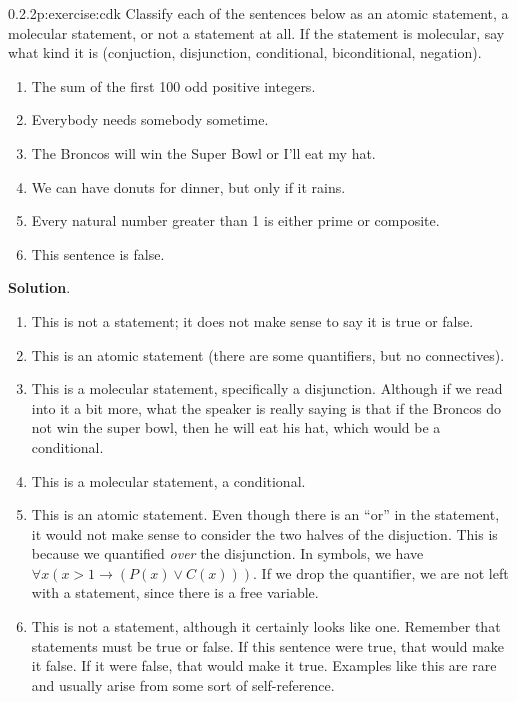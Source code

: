 \documentclass[twoside,11pt,]{book}
\newcommand{\blocktitlefont}{\relax}
\numberwithin{equation}{chapter}
\newcommand{\imp}{\rightarrow}
\begin{document}
\begin{divisionsolution}{0.2.2}{}{p:exercise:cdk}%
Classify each of the sentences below as an atomic statement, a molecular statement, or not a statement at all. If the statement is molecular, say what kind it is (conjuction, disjunction, conditional, biconditional, negation).%
\begin{enumerate}[label=(\alph*)]
\item{}The sum of the first 100 odd positive integers.%
\item{}Everybody needs somebody sometime.%
\item{}The Broncos will win the Super Bowl or I'll eat my hat.%
\item{}We can have donuts for dinner, but only if it rains.%
\item{}Every natural number greater than 1 is either prime or composite.%
\item{}This sentence is false.%
\end{enumerate}
%
\par\smallskip%
\noindent\textbf{\blocktitlefont Solution}.\quad{}%
\begin{enumerate}[label=(\alph*)]
\item{}This is not a statement; it does not make sense to say it is true or false.%
\item{}This is an atomic statement (there are some quantifiers, but no connectives).%
\item{}This is a molecular statement, specifically a disjunction. Although if we read into it a bit more, what the speaker is really saying is that if the Broncos do not win the super bowl, then he will eat his hat, which would be a conditional.%
\item{}This is a molecular statement, a conditional.%
\item{}This is an atomic statement. Even though there is an ``or'' in the statement, it would not make sense to consider the two halves of the disjuction. This is because we quantified \emph{over} the disjunction. In symbols, we have \(\forall x (x > 1 \imp (P(x) \vee C(x)))\). If we drop the quantifier, we are not left with a statement, since there is a free variable.%
\item{}This is not a statement, although it certainly looks like one. Remember that statements must be true or false. If this sentence were true, that would make it false. If it were false, that would make it true. Examples like this are rare and usually arise from some sort of self-reference.%
\end{enumerate}
%
\end{divisionsolution}%
\end{document}
